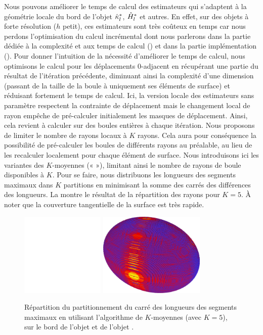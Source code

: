 Nous pouvons améliorer le temps de calcul des estimateurs qui s'adaptent à la
géométrie locale du bord de l'objet $\hat{\kappa}^{*}_{l}$, $\hat{H}^{*}_{l}$ et autres. En
effet, sur des objets à forte résolution (\cad $h$ petit), ces estimateurs sont
très coûteux en temps car nous perdons l'optimisation du calcul incrémental dont
nous parlerons dans la partie dédiée à la complexité et aux temps de calcul
() et dans la partie implémentation
(). Pour donner l'intuition de la nécessité
d'améliorer le temps de calcul, nous optimisons le calcul pour les déplacements
$0$-adjacent en récupérant une partie du résultat de l'itération précédente,
diminuant ainsi la complexité d'une dimension (passant de la taille de la boule à
uniquement ses éléments de surface) et réduisant fortement le temps de calcul.
Ici, la version locale des estimateurs sans paramètre respectent la contrainte
de déplacement mais le changement local de rayon empêche de pré-calculer
initialement les masques de déplacement. Ainsi, cela revient à calculer sur des
boules entières à chaque itération. Nous proposons de limiter le nombre de
rayons locaux à $K$ rayons. Cela aura pour conséquence la possibilité de
pré-calculer les boules de différents rayons au préalable, au lieu de les
recalculer localement pour chaque élément de surface. Nous introduisons ici les
variantes des $K$-moyennes («  »), limitant ainsi le nombre
de rayons de boule disponibles à $K$. Pour se faire, nous distribuons les
longueurs des segments maximaux dans $K$ partitions en minimisant la somme des
carrés des différences des longueurs. La 
montre le résultat de la répartition des rayons pour $K=5$. À noter que la
couverture tangentielle de la surface est très rapide.

\begin{figure}[ht]{
  \begin{center}
    \includegraphics[height=4cm]{images/Curvature/Flower_kMeans-5}
    \includegraphics[height=4cm]{images/Curvature/Ellipsoid_Radius_2}
  \end{center}}
  \caption{Répartition du partitionnement du carré des longueurs des segments maximaux en utilisant l'algorithme de $K$-moyennes (avec $K=5$), sur le bord de l'objet \Flower et de l'objet \Ellipsoid
  \label{fig:curvature-pfl-map}.}
\end{figure}

